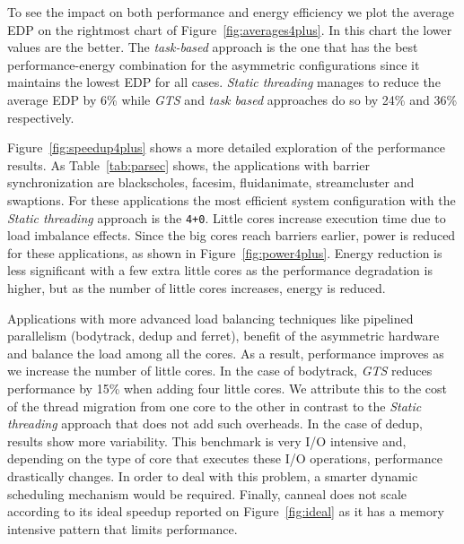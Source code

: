 To see the impact on both performance and energy efficiency we plot the average EDP on the 
rightmost chart of Figure~\ref{fig:averages4plus}. In this chart the lower values are the better. The \emph{task-based} approach is the one that has the best performance-energy 
combination for the asymmetric configurations since it maintains the lowest EDP for all cases. 
\emph{Static threading} manages to reduce the average EDP by 6\% while \emph{GTS} and \emph{task 
based} approaches do so by 24\% and 36\% respectively.

Figure~\ref{fig:speedup4plus} shows a more detailed exploration of the performance results. 
As Table~\ref{tab:parsec} shows, the applications with barrier synchronization are blackscholes, facesim, fluidanimate, streamcluster and swaptions. 
For these applications the most efficient system configuration with the \emph{Static threading} approach is the \texttt{4+0}. Little cores increase execution time due to load imbalance effects. 
Since the big cores reach barriers earlier, power is reduced for these applications, as shown in Figure~\ref{fig:power4plus}. Energy reduction is less 
significant with a few extra little cores as the performance degradation is higher, but as the 
number of little cores increases, energy is reduced. 

Applications with more advanced load balancing techniques like pipelined parallelism (bodytrack, dedup and ferret), benefit of the asymmetric hardware and balance the load among all the cores. 
As a result, performance improves as we increase the number of little cores. 
In the case of bodytrack, \emph{GTS} reduces performance by 15\% when 
adding four little cores. We attribute this to the cost of the thread migration from one core to the 
other in contrast to the \emph{Static threading} approach that does not add such overheads. 
In the case of dedup, results show more variability. This benchmark is very I/O intensive and, depending on the type of core that executes these I/O operations, performance drastically changes. In order to deal with this problem, a smarter dynamic scheduling mechanism would be required. Finally, canneal does not 
scale according to its ideal speedup reported on Figure~\ref{fig:ideal} as it has a memory intensive 
pattern that limits performance.

